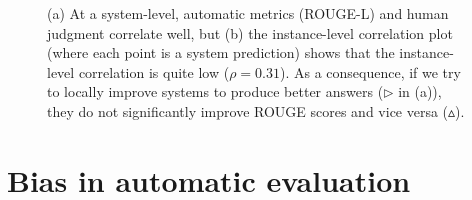 \begin{figure}[!p]
  \caption[System-level vs instance-level correlation on MS MARCO]{\label{fig:bias-msmarco}
  (a) At a system-level, automatic metrics (ROUGE-L) and human judgment correlate well, but (b) the instance-level correlation plot
  (where each point is a system prediction) shows that the instance-level correlation is quite low ($\rho = 0.31$).
  As a consequence, if we try to locally improve systems to produce better answers ($\triangleright$ in (a)),
  they do not significantly improve ROUGE scores and vice versa ($\vartriangle$).
  }
\end{figure}


\section{\label{sec:bias} Bias in automatic evaluation}



%  

